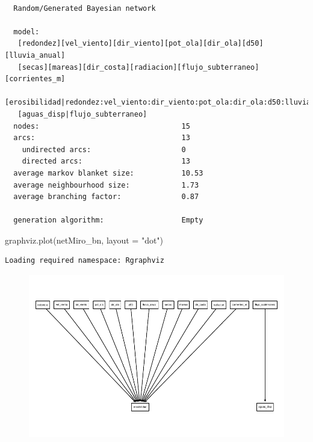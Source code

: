 \documentclass[
  letterpaper,
  DIV=11,
  numbers=noendperiod]{scrreprt}
\newenvironment{Shaded}{\begin{snugshade}}{\end{snugshade}}
\newcommand{\AttributeTok}[1]{\textcolor[rgb]{0.40,0.45,0.13}{#1}}
\newcommand{\FunctionTok}[1]{\textcolor[rgb]{0.28,0.35,0.67}{#1}}
\newcommand{\NormalTok}[1]{\textcolor[rgb]{0.00,0.23,0.31}{#1}}
\newcommand{\OtherTok}[1]{\textcolor[rgb]{0.00,0.23,0.31}{#1}}
\newcommand{\SpecialCharTok}[1]{\textcolor[rgb]{0.37,0.37,0.37}{#1}}
\newcommand{\StringTok}[1]{\textcolor[rgb]{0.13,0.47,0.30}{#1}}
\begin{document}
\begin{verbatim}

  Random/Generated Bayesian network

  model:
   [redondez][vel_viento][dir_viento][pot_ola][dir_ola][d50][lluvia_anual]
   [secas][mareas][dir_costa][radiacion][flujo_subterraneo][corrientes_m]
   [erosibilidad|redondez:vel_viento:dir_viento:pot_ola:dir_ola:d50:lluvia_anual:secas:mareas:dir_costa:radiacion:corrientes_m]
   [aguas_disp|flujo_subterraneo]
  nodes:                                 15 
  arcs:                                  13 
    undirected arcs:                     0 
    directed arcs:                       13 
  average markov blanket size:           10.53 
  average neighbourhood size:            1.73 
  average branching factor:              0.87 

  generation algorithm:                  Empty 
\end{verbatim}

\begin{Shaded}
\end{Shaded}

\begin{Shaded}
\begin{Highlighting}[]
\FunctionTok{graphviz.plot}\NormalTok{(netMiro\_bn, }\AttributeTok{layout =} \StringTok{"dot"}\NormalTok{)}
\end{Highlighting}
\end{Shaded}

\begin{verbatim}
Loading required namespace: Rgraphviz
\end{verbatim}

\begin{figure}[H]

{\centering \includegraphics{capitulos/miro-costas_files/figure-pdf/unnamed-chunk-4-1.pdf}

}

\end{figure}
\end{document}
